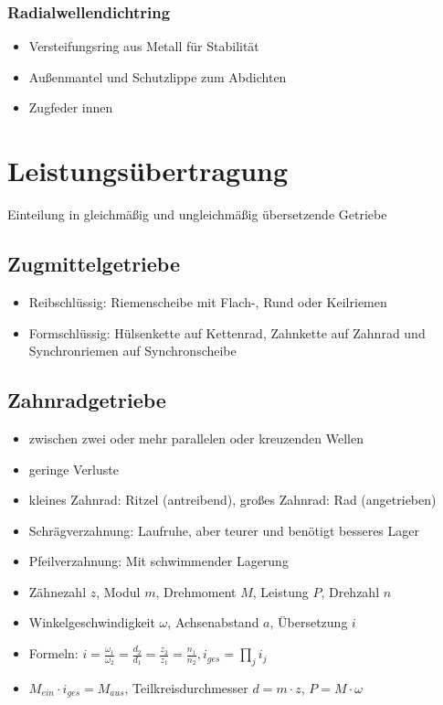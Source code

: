 \documentclass[a4paper,parskip=half*,DIV=7,fontsize=11pt]{scrartcl}
\begin{document}
\subsubsection{Radialwellendichtring}
\begin{itemize}
	\item Versteifungsring aus Metall für Stabilität
	\item Außenmantel und Schutzlippe zum Abdichten
	\item Zugfeder innen
\end{itemize}
	
\section{Leistungsübertragung}
Einteilung in gleichmäßig und ungleichmäßig übersetzende Getriebe
\subsection{Zugmittelgetriebe}
\begin{itemize}
	\item Reibschlüssig: Riemenscheibe mit Flach-, Rund oder Keilriemen
	\item Formschlüssig: Hülsenkette auf Kettenrad, Zahnkette auf Zahnrad und Synchronriemen auf Synchronscheibe
\end{itemize}
	
\subsection{Zahnradgetriebe}
\begin{itemize}
	\item zwischen zwei oder mehr parallelen oder kreuzenden Wellen
	\item geringe Verluste
	\item kleines Zahnrad: Ritzel (antreibend), großes Zahnrad: Rad (angetrieben)
	\item Schrägverzahnung: Laufruhe, aber teurer und benötigt besseres Lager
	\item Pfeilverzahnung: Mit schwimmender Lagerung
	\item Zähnezahl $z$, Modul $m$, Drehmoment $M$, Leistung $P$, Drehzahl $n$
	\item Winkelgeschwindigkeit $\omega$, Achsenabstand $a$, Übersetzung $i$
	\item Formeln: $i=\frac{\omega_1}{\omega_2}=\frac{d_2}{d_1}=\frac{z_2}{z_1}=\frac{n_1}{n_2}, i_{ges}=\prod_{j}{} i_j$
	\item $M_{ein} \cdot i_{ges}=M_{aus}$, Teilkreisdurchmesser $d= m \cdot z$, $P=M \cdot \omega$
\end{itemize}
	
\end{document}
